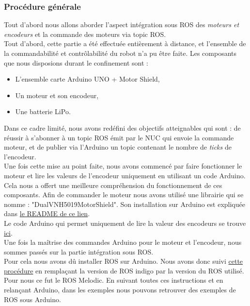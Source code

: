 \documentclass[french]{rapportENSTAB}
\begin{document}
\subsubsection{Procédure générale}
Tout d'abord nous allons aborder l'aspect intégration sous ROS des \textit{moteurs et encodeurs} et la commande des moteurs via topic ROS.\\

Tout d'abord, cette partie a été effectuée entièrement à distance, et l'ensemble de la commandabilité et contrôlabilité du robot n'a pu être faite. Les composants que nous disposions durant le confinement sont : \begin{itemize}[label=\textbullet, font=\small\color{blue}]
    \item L'ensemble carte Arduino UNO + Motor Shield,
    \item Un moteur et son encodeur,
    \item Une batterie LiPo.
\end{itemize}

Dans ce cadre limité, nous avons redéfini des objectifs atteignables qui sont : de réussir à s'abonner à un topic ROS émit par le NUC qui envoie la commande moteur, et de publier via l'Arduino un topic contenant le nombre de \textit{ticks} de l'encodeur.\\

Une fois cette mise au point faite, nous avons commencé par faire fonctionner le moteur et lire les valeurs de l'encodeur uniquement en utilisant un code Arduino. Cela nous a offert une meilleure compréhension du fonctionnement de ces composants. Afin de commander le moteur nous avons utilisé une librairie qui se nomme : "DualVNH5019MotorShield". Son installation sur Arduino est expliquée dans \href{https://github.com/AntoninLize/Projet_OrangeLabs/tree/master/Code/Arduino}{le README de ce lien}.\\

Le code Arduino qui permet uniquement de lire la valeur des encodeurs se trouve
\href{https://github.com/AntoninLize/Projet_OrangeLabs/tree/master/Code/Arduino/Encoder}{ici}.\\

Une fois la maîtrise des commandes Arduino pour le moteur et l'encodeur, nous sommes passés sur la partie intégration sous ROS.\\

Pour cela nous avons dû installer ROS sur Arduino. Nous avons donc suivi \href{http://wiki.ros.org/rosserial_arduino/Tutorials/Arduino%20IDE%20Setup}{cette procédure} en remplaçant la version de ROS indigo par la version du ROS utilisé. Pour nous ce fut le ROS Melodic. En suivant toutes ces instructions et en relançant Arduino, dans les exemples nous pouvons retrouver des exemples de ROS sous Arduino.\\ 
\end{document}
